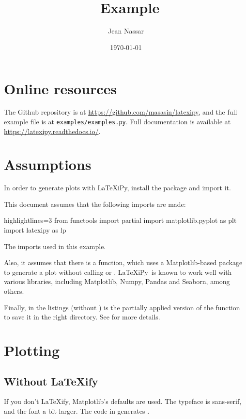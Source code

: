 \documentclass[10pt]{article}
\title{\latexipy\ Example}
\author{Jean Nassar}
\date{\today}
\newcommand\latexipy{\LaTeX iPy}
\newcommand\latexify{\LaTeX ify}
\begin{document}
\maketitle
\tableofcontents
\listoflistings
\listoffigures

\section{Online resources}
The Github repository is at \url{https://github.com/masasin/latexipy},
and the full example file is at \href{https://github.com/masasin/latexipy/blob/master/examples/examples.py}{\texttt{examples/examples.py}}.
Full documentation is available at \url{https://latexipy.readthedocs.io/}.

\section{Assumptions}
In order to generate plots with \latexipy, install the package and import it.

This document assumes that the following imports are made:

\begin{listing}[H]
  \begin{pycode*}{highlightlines=3}
    from functools import partial
    import matplotlib.pyplot as plt
    import latexipy as lp
  \end{pycode*}
  \caption[List of imports]{The imports used in this example.}
  \label{lst:imports}
\end{listing}

Also, it assumes that there is a function,  which uses a Matplotlib-based package to generate a plot without calling  or .
\latexipy\ is known to work well with various libraries, including Matplotlib, Numpy, Pandas and Seaborn, among others.

Finally,  in the listings (without ) is the partially applied version of the  function to save it in the right directory.
See  for more details.

\section{Plotting}
\subsection{Without \latexify}
If you don't \latexify, Matplotlib's defaults are used.
The typeface is sans-serif, and the font a bit larger.
The code in  generates .
\end{document}
